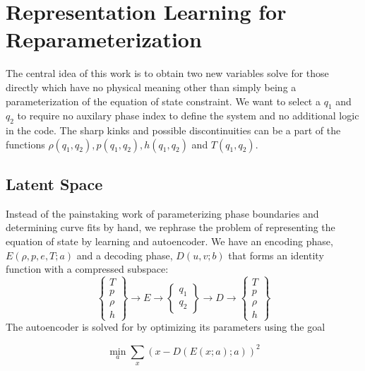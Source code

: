 \documentclass[]{article}
\begin{document}
\hypertarget{header-n3294}{%
\section{Representation Learning for
Reparameterization}\label{header-n3294}}

The central idea of this work is to obtain two new variables solve for
those directly which have no physical meaning other than simply being a
parameterization of the equation of state constraint. We want to select a
\(q_1\) and \(q_2\) to require no auxilary phase index to define the system
and no additional logic in the code. The sharp kinks and possible
discontinuities can be a part of the functions
\(\rho(q_1, q_2), p(q_1, q_2), h(q_1, q_2)\) and \(T(q_1, q_2)\).


\hypertarget{header-n3299}{%
\subsection{Latent Space}\label{header-n3299}}

Instead of the painstaking work of parameterizing phase boundaries and
determining curve fits by hand, we rephrase the problem of representing
the equation of state by learning and autoencoder. We have an encoding
phase, \(E(\rho,p,e,T; a)\) and a decoding phase, \(D(u,v; b)\) that
forms an identity function with a compressed subspace:
\begin{equation}
\left\{ \begin{array}{c}
T\\ p\\ \rho\\ h
\end{array}\right\} \rightarrow  E \rightarrow 
\left\{ \begin{array}{c} q_1\\q_2 \end{array} \right\}\rightarrow D \rightarrow 
\left\{ \begin{array}{c}
T\\ p\\ \rho\\ h
\end{array}\right\}
\end{equation}
The autoencoder is solved for by optimizing its parameters using the
goal

\begin{equation}
\min_a \sum_x \left( x - D(E(x;a);a) \right)^2
\end{equation}
\end{document}
